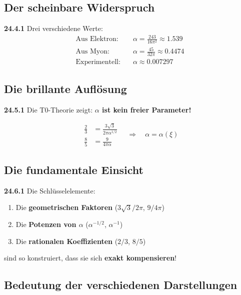 \subsection{Der scheinbare Widerspruch}

\noindent \textbf{24.4.1} Drei verschiedene Werte:
\begin{align*}
	\text{Aus Elektron:} &\quad \alpha = \frac{243}{16\pi^2} \approx 1.539 \\
	\text{Aus Myon:} &\quad \alpha = \frac{45}{32\pi} \approx 0.4474 \\
	\text{Experimentell:} &\quad \alpha \approx 0.007297
\end{align*}

\subsection{Die brillante Auflösung}

\noindent \textbf{24.5.1} Die T0-Theorie zeigt: \textbf{$\alpha$ ist kein freier Parameter!}

\[
\boxed{
	\begin{aligned}
		\frac{2}{3} &= \frac{3\sqrt{3}}{2\pi\alpha^{1/2}} \\
		\frac{8}{5} &= \frac{9}{4\pi\alpha}
	\end{aligned}
	\quad \Rightarrow \quad
	\alpha = \alpha(\xi)
}
\]

\subsection{Die fundamentale Einsicht}

\noindent \textbf{24.6.1} Die Schlüsselelemente:
\begin{enumerate}
	\item Die \textbf{geometrischen Faktoren} ($3\sqrt{3}/2\pi$, $9/4\pi$)
	\item Die \textbf{Potenzen von $\alpha$} ($\alpha^{-1/2}$, $\alpha^{-1}$)  
	\item Die \textbf{rationalen Koeffizienten} ($2/3$, $8/5$)
\end{enumerate}

\noindent sind so konstruiert, dass sie sich \textbf{exakt kompensieren}!

\subsection{Bedeutung der verschiedenen Darstellungen}

